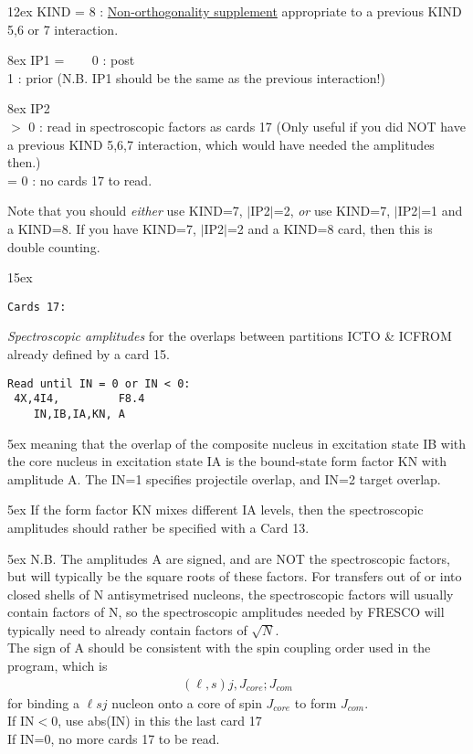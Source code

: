 \documentclass[11pt]{article}
\newcommand{\beqn}{\begin{eqnarray*}}
\newcommand{\eeqn}{\end{eqnarray*}}
\begin{document}
\hangindent 12ex
KIND = 8 :
\underline{Non-orthogonality supplement}
appropriate to a previous
KIND 5,6 or 7 interaction.


\hangindent 8ex  IP1 =
~~~  0 : post
\\  1 : prior
 (N.B. IP1 should be the same as the previous interaction!)



\hangindent 8ex  IP2
\\  $>$ 0 : read in spectroscopic factors as cards 17
 (Only useful if you did NOT have a previous KIND 5,6,7
interaction, which would have needed the amplitudes then.)
\\  = 0 : no cards 17 to read.


Note that you should {\em either} use KIND=7, $|$IP2$|$=2,
{\em or} use  KIND=7, $|$IP2$|$=1  and a KIND=8.
If you have KIND=7, $|$IP2$|$=2 and a KIND=8 card, then this is
double counting.
\bigskip





\hangindent 15ex
\begin{verbatim}
Cards 17:
\end{verbatim}
  {\em Spectroscopic amplitudes} {\rm for the overlaps between
partitions ICTO \& ICFROM already defined by a card 15}.

\begin{verbatim}
Read until IN = 0 or IN < 0:
 4X,4I4,         F8.4
    IN,IB,IA,KN, A
\end{verbatim}

\hangindent 5ex
meaning that the overlap of the composite nucleus in excitation
state IB with the core nucleus in excitation state IA is the
bound-state form factor KN with amplitude A. The IN=1 specifies
projectile overlap, and IN=2 target overlap.

\hangindent 5ex
 If the form factor KN mixes different IA levels, then the spectroscopic
 amplitudes should rather be specified with a Card 13.

\hangindent 5ex
N.B. The amplitudes A are signed, and are NOT the spectroscopic
factors, but will typically be the square roots of these factors.
For transfers out of or into closed shells of N antisymetrised nucleons,
the spectroscopic factors will usually contain factors of N,
so the spectroscopic amplitudes needed by FRESCO will typically
need to already contain factors of $\sqrt{N}$.
\\
The sign of A should be consistent with the spin coupling order used in
the program, which is
\beqn
  (\ell,s)j, J_{core}; J_{com}
\eeqn
for binding a $\ell sj$ nucleon onto a core of spin $J_{core}$ to form $J_{com}$.
\\
 If IN$<$0, use abs(IN) in this the last card 17\\
 If IN=0, no more cards 17 to be read.
\end{document}
